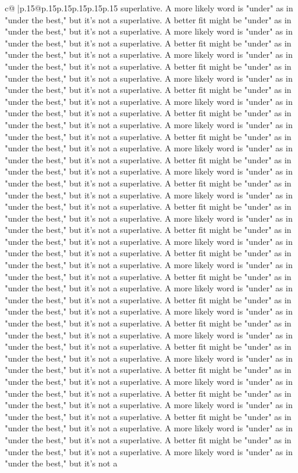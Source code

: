 \documentclass{article}
\begin{document}
{\begin{supertabular}{c@{$\;$}|p{.15\linewidth}@{}p{.15\linewidth}p{.15\linewidth}p{.15\linewidth}p{.15\linewidth}p{.15\linewidth}}
{{{superlative. A more likely word is "under" as in "under the best," but it's not a superlative. A better fit might be "under" as in "under the best," but it's not a superlative. A more likely word is "under" as in "under the best," but it's not a superlative. A better fit might be "under" as in "under the best," but it's not a superlative. A more likely word is "under" as in "under the best," but it's not a superlative. A better fit might be "under" as in "under the best," but it's not a superlative. A more likely word is "under" as in "under the best," but it's not a superlative. A better fit might be "under" as in "under the best," but it's not a superlative. A more likely word is "under" as in "under the best," but it's not a superlative. A better fit might be "under" as in "under the best," but it's not a superlative. A more likely word is "under" as in "under the best," but it's not a superlative. A better fit might be "under" as in "under the best," but it's not a superlative. A more likely word is "under" as in "under the best," but it's not a superlative. A better fit might be "under" as in "under the best," but it's not a superlative. A more likely word is "under" as in "under the best," but it's not a superlative. A better fit might be "under" as in "under the best," but it's not a superlative. A more likely word is "under" as in "under the best," but it's not a superlative. A better fit might be "under" as in "under the best," but it's not a superlative. A more likely word is "under" as in "under the best," but it's not a superlative. A better fit might be "under" as in "under the best," but it's not a superlative. A more likely word is "under" as in "under the best," but it's not a superlative. A better fit might be "under" as in "under the best," but it's not a superlative. A more likely word is "under" as in "under the best," but it's not a superlative. A better fit might be "under" as in "under the best," but it's not a superlative. A more likely word is "under" as in "under the best," but it's not a superlative. A better fit might be "under" as in "under the best," but it's not a superlative. A more likely word is "under" as in "under the best," but it's not a superlative. A better fit might be "under" as in "under the best," but it's not a superlative. A more likely word is "under" as in "under the best," but it's not a superlative. A better fit might be "under" as in "under the best," but it's not a superlative. A more likely word is "under" as in "under the best," but it's not a superlative. A better fit might be "under" as in "under the best," but it's not a superlative. A more likely word is "under" as in "under the best," but it's not a superlative. A better fit might be "under" as in "under the best," but it's not a superlative. A more likely word is "under" as in "under the best," but it's not a superlative. A better fit might be "under" as in "under the best," but it's not a superlative. A more likely word is "under" as in "under the best," but it's not a superlative. A better fit might be "under" as in "under the best," but it's not a superlative. A more likely word is "under" as in "under the best," but it's not a }}}
\end{supertabular}}
\end{document}
